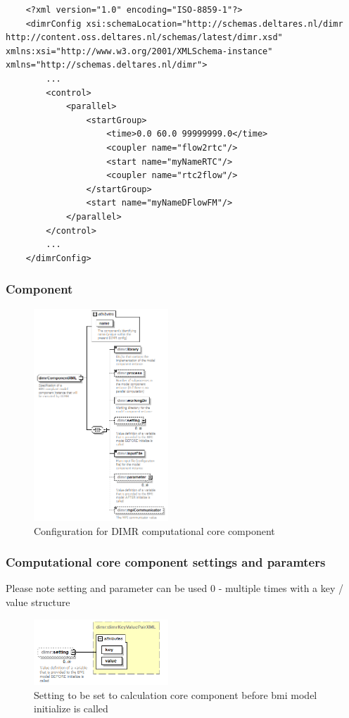 \documentclass[signature]{deltares_manual}
\newcommand{\dimr}{\textrm{DIMR}\xspace}
\begin{document}
\begin{lstlisting}
	<?xml version="1.0" encoding="ISO-8859-1"?>
	<dimrConfig xsi:schemaLocation="http://schemas.deltares.nl/dimr http://content.oss.deltares.nl/schemas/latest/dimr.xsd" xmlns:xsi="http://www.w3.org/2001/XMLSchema-instance" xmlns="http://schemas.deltares.nl/dimr">
		...
		<control>
			<parallel>
				<startGroup>
					<time>0.0 60.0 99999999.0</time>
					<coupler name="flow2rtc"/>
					<start name="myNameRTC"/>
					<coupler name="rtc2flow"/>
				</startGroup>
				<start name="myNameDFlowFM"/>
			</parallel>
		</control>
		...
	</dimrConfig>
\end{lstlisting}

\subsubsection{Component}

\begin{figure}[H]
	\centering
	\includegraphics[width=0.45\textwidth] {pictures/dimr_diagrams/dimr_p3.png}
	\caption{Configuration for \dimr computational core component} 
	\label{fig:dimrComponent}
\end{figure}
\subsubsection{Computational core component settings and paramters}
\label{subsubsec:ccc_setting_parameter}
\Note Please note setting and parameter can be used 0 - multiple times with a key / value structure

\begin{figure}[H]
	\centering
	\includegraphics[width=0.45\textwidth] {pictures/dimr_diagrams/dimr_p7.png}
	\caption{Setting to be set to calculation core component before bmi model initialize is called} 
	\label{fig:dimrComponentSetting}
\end{figure}
\end{document}
